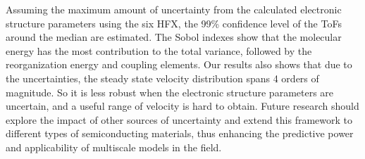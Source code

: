 \documentclass[%
 reprint,
 amsmath,amssymb,
 aps,
]{revtex4-2}
\begin{document}
Assuming the maximum amount of uncertainty from the calculated electronic structure parameters using the six HFX, the 99\% confidence level of the ToFs around the median are estimated. The Sobol indexes show that the molecular energy has the most contribution to the total variance, followed by the reorganization energy and coupling elements. Our results also shows that due to the uncertainties, the steady state velocity distribution spans 4 orders of magnitude. So it is less robust when
the electronic structure parameters are uncertain, and a useful range of velocity is hard to obtain. Future research should explore the impact of other sources of uncertainty and extend this framework to different types of semiconducting materials, thus enhancing the predictive power and applicability of multiscale models in the field.
\nocite{*}

\end{document}
